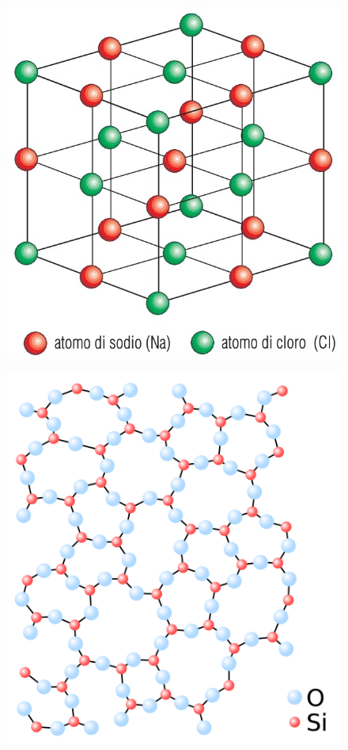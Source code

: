     \begin{figure}[h]
    \centering
  \begin{minipage}[b]{0.3\linewidth}
    \centering
    \includegraphics[width=\linewidth]{struttura/cristallo.jpg}
    \label{cristallo}
  \end{minipage}
  \begin{minipage}[b]{0.3\linewidth}
    \centering
    \includegraphics[width=\linewidth]{struttura/amorfo.png}
    \label{amorfo}  


\end{minipage}
\end{figure}

